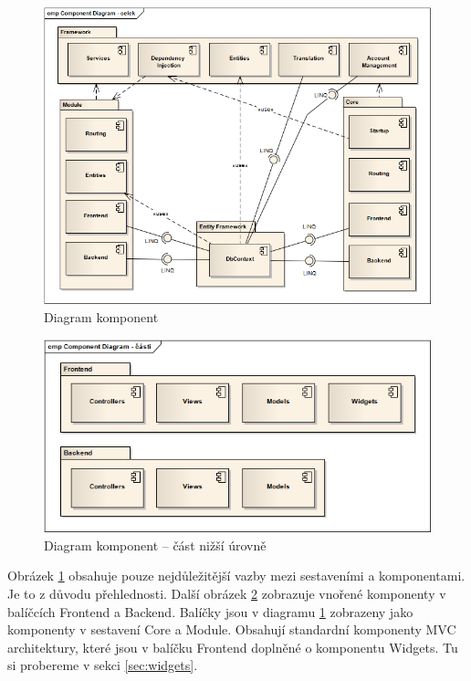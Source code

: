 \documentclass[11pt,twoside,a4paper]{book}
\begin{document}
\begin{figure}[h!]
\begin{center}
\includegraphics[scale=0.65,angle=0]{figures/componentsextract}
\caption{Diagram komponent}
\label{fig:components}
\end{center}
\end{figure}

\begin{figure}[h!]
\begin{center}
\includegraphics[scale=0.75,angle=0]{figures/componentslow}
\caption{Diagram komponent -- část nižší úrovně}
\label{fig:componentslow}
\end{center}
\end{figure}

Obrázek \ref{fig:components} obsahuje pouze nejdůležitější vazby mezi sestaveními a komponentami. Je to z důvodu přehlednosti. Další obrázek \ref{fig:componentslow} zobrazuje vnořené komponenty v balíčcích \textsf{Frontend} a \textsf{Backend}. Balíčky jsou v diagramu \ref{fig:components} zobrazeny jako komponenty v sestavení \textsf{Core} a \textsf{Module}. Obsahují standardní komponenty MVC architektury, které jsou v balíčku \textsf{Frontend} doplněné o komponentu \textsf{Widgets}. Tu si probereme v sekci \ref{sec:widgets}.
\end{document}

